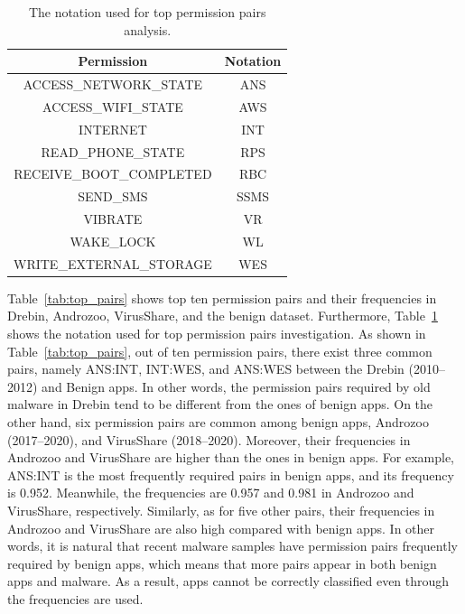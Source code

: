 \documentclass{ieeeaccess}
\newcommand{\mytablename}{Table}
\begin{document}
\begin{table}[t]
  \begin{center}
    \caption{The notation used for top permission pairs analysis.}
    \label{tab:notation_permission}
    \begin{tabular}{|c|c|} 
      \hline
      \textbf{Permission} & \textbf{Notation} \\ \hline 
       ACCESS\_NETWORK\_STATE & ANS \\ \hline 
       ACCESS\_WIFI\_STATE & AWS \\ \hline
       INTERNET & INT \\ \hline
       READ\_PHONE\_STATE & RPS \\ \hline
       RECEIVE\_BOOT\_COMPLETED & RBC \\ \hline
       SEND\_SMS & SSMS \\ \hline
       VIBRATE & VR \\ \hline
       WAKE\_LOCK & WL \\ \hline
       WRITE\_EXTERNAL\_STORAGE & WES \\ 
       \hline
    \end{tabular}
  \end{center}
\end{table}
\mytablename~\ref{tab:top_pairs} shows top ten permission pairs and their frequencies in Drebin, Androzoo, VirusShare, and the benign dataset.
Furthermore, \mytablename~\ref{tab:notation_permission} shows the notation used for top permission pairs investigation.
As shown in \mytablename~\ref{tab:top_pairs}, out of ten permission pairs, there exist three common pairs, namely ANS:INT, INT:WES, and ANS:WES between the Drebin (2010--2012) and Benign apps.
In other words, the permission pairs required by old malware in Drebin tend to be different from the ones of benign apps.
On the other hand, six permission pairs are common among benign apps, Androzoo (2017--2020), and VirusShare (2018--2020).
Moreover, their frequencies in Androzoo and VirusShare are higher than the ones in benign apps.
For example, ANS:INT is the most frequently required pairs in benign apps, and its frequency is 0.952.
Meanwhile, the frequencies are 0.957 and 0.981 in Androzoo and VirusShare, respectively.
Similarly, as for five other pairs, their frequencies in Androzoo and VirusShare are also high compared with benign apps.
In other words, it is natural that recent malware samples have permission pairs frequently required by benign apps, which means that more pairs appear in both benign apps and malware. 
As a result, apps cannot be correctly classified even through the frequencies are used.
\end{document}
